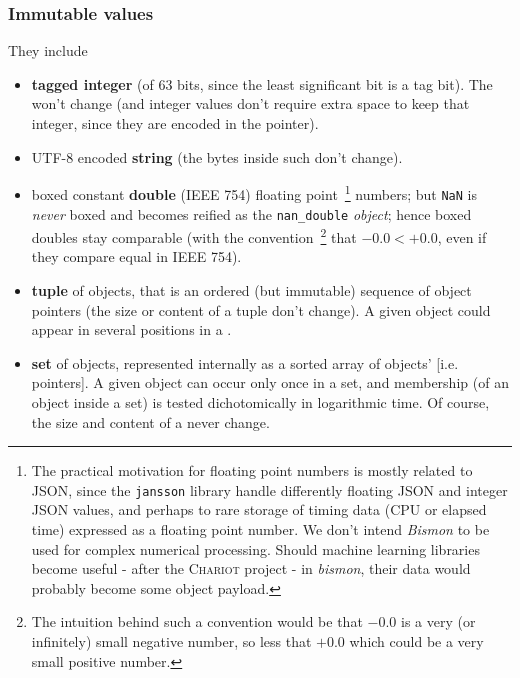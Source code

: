 \subsubsection{Immutable values}
\label{subsubsec:immutvalues}

They include

\begin{itemize}

\item \textbf{tagged integer} (of 63 bits, since the least significant
  bit is a tag bit). The  won't change (and
  integer values don't require extra space to keep that integer, since
  they are encoded in the pointer).
  
\item UTF-8 encoded \textbf{string} (the bytes inside such
   don't change).

  \item boxed constant \textbf{double}   (IEEE 754) floating
    point~\footnote{The practical motivation for floating point
      numbers is mostly related to JSON, since the \texttt{jansson}
      library handle differently floating JSON and integer JSON
      values, and perhaps to rare storage of timing data (CPU or
      elapsed time) expressed as a floating point number. We don't
      intend \emph{Bismon} to be used for complex numerical
      processing. Should machine learning libraries become useful -
      after the \textsc{Chariot} project - in \emph{bismon}, their
      data would probably become some object payload.}  numbers; but
    \texttt{NaN} is \emph{never} boxed and becomes reified as the
    \texttt{nan\_double} \emph{object}; hence boxed doubles stay
    comparable (with the convention~\footnote{The intuition behind
      such a convention would be that $-0.0$ is a very (or infinitely)
      small negative number, so less that $+0.0$ which could be a very
      small positive number.}  that $-0.0 < +0.0$, even if they
    compare equal in IEEE 754).

  \item \textbf{tuple} of objects, that is an ordered (but immutable)
    sequence of object pointers (the size or content of a tuple don't
    change). A given object could appear in several positions in a
    .

  \item \textbf{set} of objects, represented internally as a sorted
    array of objects' [i.e. pointers]. A given object can occur only once in a
    set, and membership (of an object inside a set) is tested
    dichotomically in logarithmic time. Of course, the size and
    content of a  never change.


\end{itemize}
